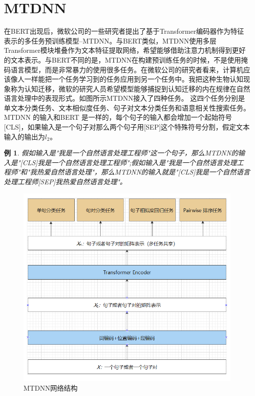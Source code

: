 \documentclass[twoside,a4paper,12pt]{book}%
\newtheorem{example}{例}
\begin{document}
\section{MTDNN}
在\gls{BERT}出现后，微软公司的一些研究者提出了基于Transformer编码器作为特征表示的多任务预训练模型--\gls{MTDNN}。与\gls{BERT}类似，\gls{MTDNN}使用多层Transformer模块堆叠作为文本特征提取网络，希望能够借助注意力机制得到更好的文本表示。与\gls{BERT}不同的是，\gls{MTDNN}在构建预训练任务的时候，不是使用掩码语言模型，而是非常暴力的使用很多任务。在微软公司的研究者看来，计算机应该像人一样能把一个任务学习到的任务应用到另一个任务中。我把这种生物认知现象称为认知迁移，微软的研究人员希望模型能够捕捉到认知迁移的内在规律在自然语言处理中的表现形式。如图所示\gls{MTDNN}接入了四种任务。 这四个任务分别是单文本分类任务、文本相似度任务、句子对文本分类任务和语意相关性搜索任务。\gls{MTDNN} 的输入和\gls{BERT} 是一样的，每个句子的输入都会增加一个起始符号[CLS]，如果输入是一个句子对那么两个句子用[SEP]这个特殊符号分割，假定文本输入的输出为$l_2$。
\begin{example}
假如输入是"我是一个自然语言处理工程师"这一个句子，那么\gls{MTDNN}的输入是"[CLS]我是一个自然语言处理工程师";假如输入是"我是一个自然语言处理工程师"和"我热爱自然语言处理"，那么\gls{MTDNN}的输入就是"[CLS]我是一个自然语言处理工程师[SEP]我热爱自然语言处理"。
\end{example}
\begin{figure}[htbp]
\begin{center}
\includegraphics[width=5.8in]{figures/mtdnn1.png}
\caption{MTDNN网络结构}
\label{fig:mtdnn1}
\end{center}
\end{figure}
\end{document}
